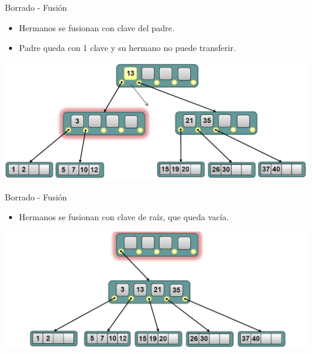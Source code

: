 \documentclass[handout]{beamer} %
\begin{document}
\begin{frame}{Borrado - Fusión}
    \vspace{-2ex}

    {\small
    \begin{itemize}
        \item Hermanos se fusionan con clave del padre.\\[-1ex]
        \item Padre queda con 1 clave y su hermano no puede transferir.
    \end{itemize}}
    \vspace{-3ex}

    \begin{center}
        \includegraphics[width=\textwidth]{./image/cap3/b-tree-delete10}
    \end{center}
\end{frame}

\begin{frame}{Borrado - Fusión}
    \begin{itemize}
        \item Hermanos se fusionan con clave de raíz, que queda vacía.
    \end{itemize}
    \begin{center}
        \includegraphics[width=\textwidth]{./image/cap3/b-tree-delete11}
    \end{center}
\end{frame}
\end{document}
